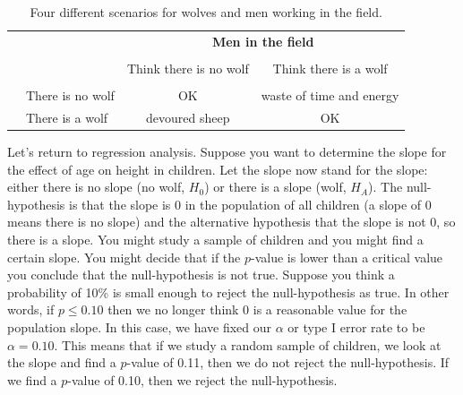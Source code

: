 \documentclass[]{book}\usepackage[]{graphicx}\usepackage[]{color}
\begin{document}
\begin{table}[ht]
\centering
\begin{tabular}{l l c c}
& & \multicolumn{2}{c}{\textbf{Men in the field}} \\
  \cline{3-4}
\vspace{-3.7mm} \\
& & Think there is no wolf  &  Think there is a wolf \\
  \cline{2-4}
\vspace{-3.7mm} \\
& There is no wolf & OK &  waste of time and energy \\
\raisebox{1.5ex}{\textbf{Truth}} & There is a wolf & devoured sheep & OK \\
  \cline{2-4}
\end{tabular}
\caption{Four different scenarios for wolves and men working in the field.}
\label{fig:Aesop}
\end{table}





Let's return to regression analysis. Suppose you want to determine the slope for the effect of age on height in children. Let the slope now stand for the slope: either there is no slope (no wolf, $H_0$) or there is a slope (wolf, $H_A$). The null-hypothesis is that the slope is 0 in the population of all children (a slope of 0 means there is no slope) and the alternative hypothesis that the slope is not 0, so there is a slope. You might study a sample of children and you might find a certain slope. You might decide that if the $p$-value is lower than a critical value you conclude that the null-hypothesis is not true. Suppose you think a probability of 10\% is small enough to reject the null-hypothesis as true. In other words, if $p \leq 0.10$ then we no longer think 0 is a reasonable value for the population slope. In this case, we have fixed our $\alpha$ or type I error rate to be $\alpha=0.10$. This means that if we study a random sample of children, we look at the slope and find a $p$-value of 0.11, then we do not reject the null-hypothesis. If we find a $p$-value of 0.10, then we reject the null-hypothesis.
\end{document}
